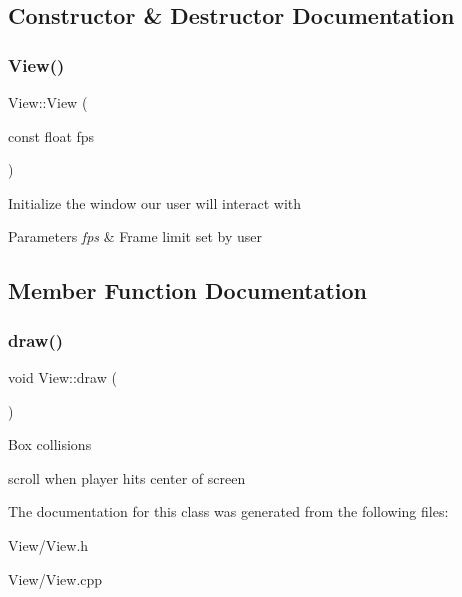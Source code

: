\subsection{Constructor \& Destructor Documentation}
\mbox{\label{class_view_a11dfb2fbc3e20eb48c96b8e8a20687cb}} 
\subsubsection{\texorpdfstring{View()}{View()}}
{\footnotesize\ttfamily View\+::\+View (\begin{DoxyParamCaption}\item[{const float}]{fps }\end{DoxyParamCaption})\hspace{0.3cm}{\ttfamily [inline]}}

Initialize the window our user will interact with 
\begin{DoxyParams}{Parameters}
{\em fps} & Frame limit set by user \\
\hline
\end{DoxyParams}


\subsection{Member Function Documentation}
\mbox{\label{class_view_ad26b8f3c6e07b3a8292ad508c5d081b5}} 
\subsubsection{\texorpdfstring{draw()}{draw()}}
{\footnotesize\ttfamily void View\+::draw (\begin{DoxyParamCaption}{ }\end{DoxyParamCaption})\hspace{0.3cm}{\ttfamily [inline]}}

Box collisions

scroll when player hits center of screen

The documentation for this class was generated from the following files\+:\begin{DoxyCompactItemize}
\item 
View/View.\+h\item 
View/View.\+cpp\end{DoxyCompactItemize}
